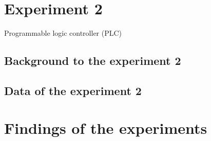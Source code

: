 \section{Experiment 2}
\label{sec:Experiment2}
Programmable logic controller (PLC)

\subsection{Background to the experiment 2}
\label{subsec:Backgroud to experiment 2}

\subsection{Data of the experiment 2}
\label{subsec:Data of the experiment 2}

\section{Findings of the experiments}
\label{sec:findings of the experiments}
